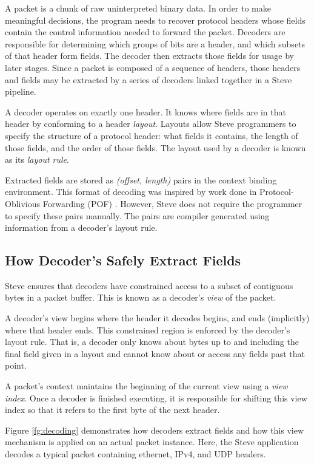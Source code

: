 A packet is a chunk of raw uninterpreted binary data.
In order to make meaningful decisions, the program needs to
recover protocol headers whose fields contain the control
information needed to forward the packet.
Decoders are responsible for determining which
groups of bits are a header, and which subsets of that header form fields. 
The decoder then extracts those fields for usage by later stages.
Since a packet is composed of a sequence of headers, those headers and fields
may be extracted by a series of decoders linked together in a Steve pipeline.

A decoder operates on exactly one header.
It knows where fields are in that header by conforming to a header \emph{layout}.
Layouts allow Steve programmers to specify the structure of a
protocol header: what fields it contains, the length of those
fields, and the order of those fields.
The layout used by a decoder is known as its \emph{layout rule}.

Extracted fields are stored as \emph{(offset, length)} pairs in
the context binding environment. 
This format of decoding was inspired by work done in Protocol-Oblivious Forwarding 
(POF) \cite{pof, pof_fis, pof_impl}.
However, Steve does not require the programmer to specify these pairs manually.
The pairs are compiler generated using information from a
decoder's layout rule.

\subsection{How Decoder's Safely Extract Fields} \label{tut:extract_how}

Steve ensures that decoders have constrained
access to a subset of contiguous bytes in a packet buffer.
This is known as a decoder's \emph{view} of the packet.

A decoder's view begins where the header it decodes begins, and ends
(implicitly) where that header ends. 
This constrained region is enforced by the decoder's layout rule. 
That is, a decoder only knows about bytes up to and including the final field given in a layout and cannot know about or access any fields past that point.

A packet's context maintains the beginning of the current view using
a \emph{view index}. Once a decoder is finished executing, it is
responsible for shifting this view index so that it refers to the
first byte of the next header.

Figure \ref{fg:decoding} demonstrates how decoders extract fields and
how this view mechanism is applied on an actual packet instance. 
Here, the Steve application decodes a typical packet 
containing ethernet, IPv4, and UDP headers.


